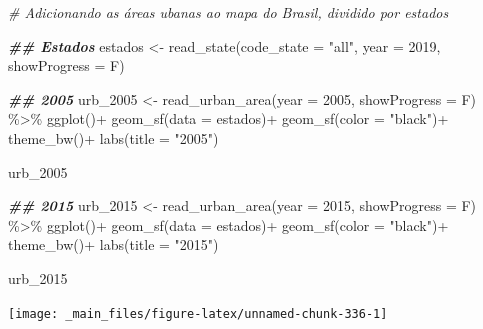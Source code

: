 \documentclass[
  brazilian,
]{book}
\newenvironment{Shaded}{\begin{snugshade}}{\end{snugshade}}
\newcommand{\AttributeTok}[1]{\textcolor[rgb]{0.77,0.63,0.00}{#1}}
\newcommand{\CommentTok}[1]{\textcolor[rgb]{0.56,0.35,0.01}{\textit{#1}}}
\newcommand{\DecValTok}[1]{\textcolor[rgb]{0.00,0.00,0.81}{#1}}
\newcommand{\DocumentationTok}[1]{\textcolor[rgb]{0.56,0.35,0.01}{\textbf{\textit{#1}}}}
\newcommand{\FunctionTok}[1]{\textcolor[rgb]{0.00,0.00,0.00}{#1}}
\newcommand{\NormalTok}[1]{#1}
\newcommand{\OtherTok}[1]{\textcolor[rgb]{0.56,0.35,0.01}{#1}}
\newcommand{\SpecialCharTok}[1]{\textcolor[rgb]{0.00,0.00,0.00}{#1}}
\newcommand{\StringTok}[1]{\textcolor[rgb]{0.31,0.60,0.02}{#1}}
\begin{document}
\begin{Shaded}
\begin{Highlighting}[]
\CommentTok{\# Adicionando as áreas ubanas ao mapa do Brasil, dividido por estados}

\DocumentationTok{\#\# Estados}
\NormalTok{estados }\OtherTok{\textless{}{-}} \FunctionTok{read\_state}\NormalTok{(}\AttributeTok{code\_state =} \StringTok{"all"}\NormalTok{,}
                      \AttributeTok{year =} \DecValTok{2019}\NormalTok{,}
                      \AttributeTok{showProgress =}\NormalTok{ F)}

\DocumentationTok{\#\# 2005}
\NormalTok{urb\_2005 }\OtherTok{\textless{}{-}} \FunctionTok{read\_urban\_area}\NormalTok{(}\AttributeTok{year =} \DecValTok{2005}\NormalTok{,}
                            \AttributeTok{showProgress =}\NormalTok{ F) }\SpecialCharTok{\%\textgreater{}\%} 
  \FunctionTok{ggplot}\NormalTok{()}\SpecialCharTok{+}
  \FunctionTok{geom\_sf}\NormalTok{(}\AttributeTok{data =}\NormalTok{ estados)}\SpecialCharTok{+}
  \FunctionTok{geom\_sf}\NormalTok{(}\AttributeTok{color =} \StringTok{"black"}\NormalTok{)}\SpecialCharTok{+}
  \FunctionTok{theme\_bw}\NormalTok{()}\SpecialCharTok{+}
  \FunctionTok{labs}\NormalTok{(}\AttributeTok{title =} \StringTok{"2005"}\NormalTok{)}

\NormalTok{urb\_2005}
\end{Highlighting}
\end{Shaded}

\begin{Shaded}
\begin{Highlighting}[]
\DocumentationTok{\#\# 2015}
\NormalTok{urb\_2015 }\OtherTok{\textless{}{-}} \FunctionTok{read\_urban\_area}\NormalTok{(}\AttributeTok{year =} \DecValTok{2015}\NormalTok{,}
                            \AttributeTok{showProgress =}\NormalTok{ F) }\SpecialCharTok{\%\textgreater{}\%} 
  \FunctionTok{ggplot}\NormalTok{()}\SpecialCharTok{+}
  \FunctionTok{geom\_sf}\NormalTok{(}\AttributeTok{data =}\NormalTok{ estados)}\SpecialCharTok{+}
  \FunctionTok{geom\_sf}\NormalTok{(}\AttributeTok{color =} \StringTok{"black"}\NormalTok{)}\SpecialCharTok{+}
  \FunctionTok{theme\_bw}\NormalTok{()}\SpecialCharTok{+}
  \FunctionTok{labs}\NormalTok{(}\AttributeTok{title =} \StringTok{"2015"}\NormalTok{)}

\NormalTok{urb\_2015}
\end{Highlighting}
\end{Shaded}

\begin{center}\texttt{[image: \_main\_files/figure-latex/unnamed-chunk-336-1]} \end{center}
\end{document}
